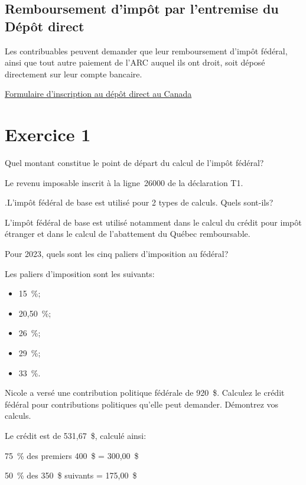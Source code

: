 \subsection{Remboursement d'impôt par l'entremise du Dépôt direct}
Les contribuables peuvent demander que leur remboursement d'impôt fédéral, ainsi que tout autre paiement de l'ARC auquel ils ont droit, soit déposé directement sur leur compte bancaire.

\cat\href{https://www.tpsgc-pwgsc.gc.ca/recgen/form/inscription-enrolment-fra.html}{Formulaire d'inscription au dépôt direct au Canada}
\section{Exercice 1}
\setcounter{question}{0}
\begin{question}
	Quel montant constitue le point de départ du calcul de l'impôt fédéral?
\end{question}
Le revenu imposable inscrit à la ligne~26000 de la déclaration T1.

\begin{question}
	.L'impôt fédéral de base est utilisé pour 2 types de calculs. Quels sont-ils?
\end{question}
L'impôt fédéral de base est utilisé notamment dans le calcul du crédit pour impôt étranger et dans le calcul de l'abattement du Québec remboursable.

\begin{question}
	Pour 2023, quels sont les cinq paliers d'imposition au fédéral?
\end{question}
Les paliers d'imposition sont les suivants:
\begin{itemize}
	\item 15~\%;
	\item 20,50~\%;
	\item 26~\%;
	\item 29~\%;
	\item 33~\%.
\end{itemize}

\begin{question}
	Nicole a versé une contribution politique fédérale de 920~\$. 
	Calculez le crédit fédéral pour contributions politiques qu'elle peut demander. Démontrez vos calculs.
\end{question}
Le crédit est de 531,67~\$, calculé ainsi:

75~\% des premiers 400~\$ = 300,00~\$

50~\% des 350~\$ suivants = 175,00~\$

